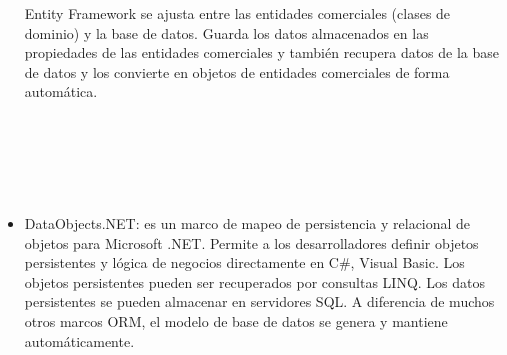 \documentclass[%
 reprint,
 amsmath,amssymb,
 aps,
]{revtex4-1}
\begin{document}
\begin{itemize}
\begin{figure}[htb]
\begin{center}
\end{center}
\end{figure}
 Entity Framework se ajusta entre las entidades comerciales (clases de dominio) y la base de datos. Guarda los datos almacenados en las propiedades de las entidades comerciales y también recupera datos de la base de datos y los convierte en objetos de entidades comerciales de forma automática.\\
\\
\\
\\
\\
\\
	\item DataObjects.NET: es un marco de mapeo de persistencia y relacional de objetos para Microsoft .NET. Permite a los desarrolladores definir objetos persistentes y lógica de negocios directamente en C\#, Visual Basic. Los objetos persistentes pueden ser recuperados por consultas LINQ. Los datos persistentes se pueden almacenar en servidores SQL. A diferencia de muchos otros marcos ORM, el modelo de base de datos se genera y mantiene automáticamente.\cite{do} \\
\end{itemize}
\end{document}
